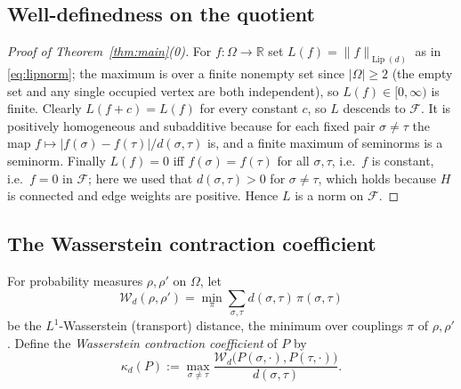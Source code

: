 \documentclass{amsart}
\DeclareMathOperator{\Lip}{Lip}
\newcommand{\Om}{\Omega}
\newcommand{\R}{\mathbb{R}}
\newcommand{\Wd}{\mathcal{W}_d}
\begin{document}
\subsection{Well-definedness on the quotient}
\begin{proof}[Proof of Theorem~\ref{thm:main}(0)]
For $f:\Om\to\R$ set $L(f)=\|f\|_{\Lip(d)}$ as in \eqref{eq:lipnorm}; the maximum
is over a finite nonempty set since $|\Om|\ge2$ (the empty set and any single
occupied vertex are both independent), so $L(f)\in[0,\infty)$ is finite. Clearly
$L(f+c)=L(f)$ for every constant $c$, so $L$ descends to $\mathcal F$.
It is positively homogeneous and subadditive because for each fixed pair
$\sigma\neq\tau$ the map $f\mapsto|f(\sigma)-f(\tau)|/d(\sigma,\tau)$ is, and a
finite maximum of seminorms is a seminorm. Finally $L(f)=0$ iff
$f(\sigma)=f(\tau)$ for all $\sigma,\tau$, i.e.\ $f$ is constant, i.e.\ $f=0$ in
$\mathcal F$; here we used that $d(\sigma,\tau)>0$ for $\sigma\neq\tau$, which
holds because $H$ is connected and edge weights are positive. Hence $L$ is a norm
on $\mathcal F$.
\end{proof}

\subsection{The Wasserstein contraction coefficient}
For probability measures $\rho,\rho'$ on $\Om$, let
\[
\Wd(\rho,\rho')=\min_{\pi}\sum_{\sigma,\tau}d(\sigma,\tau)\,\pi(\sigma,\tau)
\]
be the $L^1$-Wasserstein (transport) distance, the minimum over couplings
$\pi$ of $\rho,\rho'$. Define the \emph{Wasserstein contraction coefficient}
of $P$ by
\begin{equation}\label{eq:kappa}
\kappa_d(P):=\max_{\sigma\neq\tau}\frac{\Wd\big(P(\sigma,\cdot),P(\tau,\cdot)\big)}{d(\sigma,\tau)} .
\end{equation}
\end{document}
